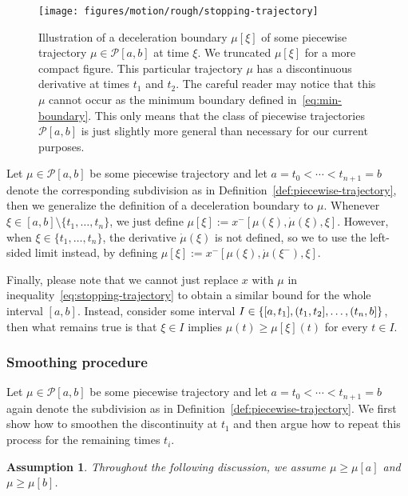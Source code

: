 \documentclass[a4paper]{article}
\theoremstyle{definition}
\theoremstyle{plain}
\newtheorem{assump}{Assumption\hspace{0.25em}\ignorespaces}
\begin{document}
\begin{figure}
  \centering
  \texttt{[image: figures/motion/rough/stopping-trajectory]}
  \caption{Illustration of a deceleration boundary $\mu[\xi]$ of some piecewise
    trajectory $\mu \in \mathcal{P}[a,b]$ at time $\xi$. We truncated $\mu[\xi]$
    for a more compact figure. This particular trajectory $\mu$ has a
    discontinuous derivative at times $t_{1}$ and $t_{2}$. The careful reader
    may notice that this $\mu$ cannot occur as the minimum boundary defined
    in~\eqref{eq:min-boundary}. This only means that the class of piecewise
    trajectories $\mathcal{P}[a,b]$ is just slightly more general than necessary
    for our current purposes.}%
  \label{fig:stopping-trajectory}
\end{figure}

Let $\mu \in \mathcal{P}[a, b]$ be some piecewise trajectory and let
$a = t_{0} < \cdots < t_{n+1} = b$ denote the corresponding subdivision as in
Definition~\ref{def:piecewise-trajectory}, then we generalize the definition of
a deceleration boundary to $\mu$.
%
Whenever $\xi \in [a,b] \setminus \{ t_{1}, \dots, t_{n}\}$, we just define
$\mu[\xi] := x^{-}[\mu(\xi), \dot{\mu}(\xi), \xi]$.
%
However, when $\xi \in \{ t_{1}, \dots, t_{n}\}$, the derivative
$\dot{\mu}(\xi)$ is not defined, so we to use the left-sided limit instead, by
defining $\mu[\xi] := x^{-}[\mu(\xi), \dot{\mu}(\xi^{-}), \xi]$.

Finally, please note that we cannot just replace $x$ with $\mu$ in
inequality~\eqref{eq:stopping-trajectory} to obtain a similar bound for the
whole interval $[a,b]$.
%
Instead, consider some interval
$I \in \{ [a, t_{1}], (t_{1},t_{2}], \dots, (t_{n},b] \}$,
then what remains true is that $\xi \in I$ implies $\mu(t) \geq \mu[\xi](t)$ for
every $t \in I$.


\subsubsection{Smoothing procedure}\label{sec:smoothing}
Let $\mu \in \mathcal{P}[a,b]$ be some piecewise trajectory and let
$a = t_{0} < \cdots < t_{n+1} = b$ again denote the subdivision as in Definition~\ref{def:piecewise-trajectory}.
%
We first show how to smoothen the discontinuity at $t_{1}$ and then argue how to
repeat this process for the remaining times $t_{i}$.

\begin{assump}
  Throughout the following discussion, we assume $\mu \geq \mu[a]$ and $\mu \geq \mu[b]$.
\end{assump}
\end{document}
